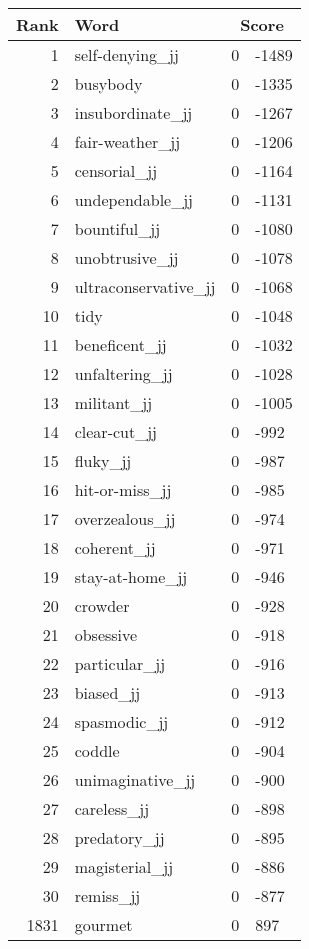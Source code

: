 \begin{longtable}[!htbp]{| rlr@{.}l |}
    \hline
    \textbf{Rank} & \textbf{Word} & \multicolumn{2}{c|}{\textbf{Score}} \\
    \hline
    \endhead
    1 & self-denying\_jj & 0 & -1489 \\
    2 & busybody & 0 & -1335 \\
    3 & insubordinate\_jj & 0 & -1267 \\
    4 & fair-weather\_jj & 0 & -1206 \\
    5 & censorial\_jj & 0 & -1164 \\
    6 & undependable\_jj & 0 & -1131 \\
    7 & bountiful\_jj & 0 & -1080 \\
    8 & unobtrusive\_jj & 0 & -1078 \\
    9 & ultraconservative\_jj & 0 & -1068 \\
    10 & tidy & 0 & -1048 \\
    11 & beneficent\_jj & 0 & -1032 \\
    12 & unfaltering\_jj & 0 & -1028 \\
    13 & militant\_jj & 0 & -1005 \\
    14 & clear-cut\_jj & 0 & -992 \\
    15 & fluky\_jj & 0 & -987 \\
    16 & hit-or-miss\_jj & 0 & -985 \\
    17 & overzealous\_jj & 0 & -974 \\
    18 & coherent\_jj & 0 & -971 \\
    19 & stay-at-home\_jj & 0 & -946 \\
    20 & crowder & 0 & -928 \\
    21 & obsessive & 0 & -918 \\
    22 & particular\_jj & 0 & -916 \\
    23 & biased\_jj & 0 & -913 \\
    24 & spasmodic\_jj & 0 & -912 \\
    25 & coddle & 0 & -904 \\
    26 & unimaginative\_jj & 0 & -900 \\
    27 & careless\_jj & 0 & -898 \\
    28 & predatory\_jj & 0 & -895 \\
    29 & magisterial\_jj & 0 & -886 \\
    30 & remiss\_jj & 0 & -877 \\
    1831 & gourmet & 0 & 897 \\

\end{longtable}
